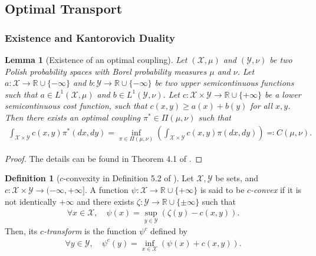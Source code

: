 \documentclass{article}
\theoremstyle{plain}
\newtheorem{lemma}[theorem]{Lemma}
\theoremstyle{definition}
\newtheorem{definition}[theorem]{Definition}
\theoremstyle{remark}
\begin{document}
\subsection{Optimal Transport}\label{App:optimal-transport}
\subsubsection{Existence and Kantorovich Duality}
\begin{lemma}[Existence of an optimal coupling]
	\label{lem:existence-of-optimal-coupling-general-wasserstein}
	Let $(\mathcal{X},\mu)$ and $(\mathcal{Y},\nu)$ be two Polish probability spaces with Borel probability measures $\mu$ and $\nu$. Let $a: \mathcal{X} \to \mathbb{R} \cup \{-\infty\}$ and $b: \mathcal{Y} \to \mathbb{R} \cup \{-\infty\}$ be two upper semicontinuous functions such that $a \in L^1(\mathcal{X},\mu)$ and $b \in L^1(\mathcal{Y},\nu)$. Let $c : \mathcal{X} \times \mathcal{Y} \to \mathbb{R} \cup \{+\infty\}$ be a lower semicontinuous cost function, such that $c(x,y) \geq a(x) + b(y)$ for all $x,y$. Then there exists an optimal coupling $\pi^* \in \Pi(\mu,\nu)$ such that
	\begin{align*}
		\int_{\mathcal{X} \times \mathcal{Y}} c(x,y) \pi^*(dx,dy) = \inf_{\pi \in \Pi(\mu,\nu)} \left(\int_{\mathcal{X} \times \mathcal{Y}} c(x,y) \pi(dx,dy)\right) \eqqcolon C(\mu,\nu) .
	\end{align*}
\end{lemma}
\begin{proof}
	The details can be found in Theorem 4.1 of \citet{villani2008optimal}.
\end{proof}

\begin{definition}[$c$-convexity in Definition 5.2 of \citet{villani2008optimal}]
	Let $\mathcal{X},\mathcal{Y}$ be sets, and $c : \mathcal{X} \times \mathcal{Y} \to (-\infty,+\infty]$. A function $\psi: \mathcal{X} \to \mathbb{R} \cup \{+\infty\}$ is said to be \emph{$c$-convex} if it is not identically $+\infty$ and there exists $\zeta: \mathcal{Y} \to \mathbb{R} \cup \{\pm \infty\}$ such that
	\begin{align*}
		\forall x \in \mathcal{X} , \quad \psi(x) = \sup_{y \in \mathcal{Y}}\left(\zeta(y) - c(x,y)\right) .
	\end{align*} 
	Then, its \emph{$c$-transform} is the function $\psi^c$ defined by
	\begin{align*}
		\forall y \in \mathcal{Y} , \quad \psi^c(y) = \inf_{x \in \mathcal{X}} \left(\psi(x) + c(x,y)\right) .
	\end{align*}
\end{definition}
\end{document}
